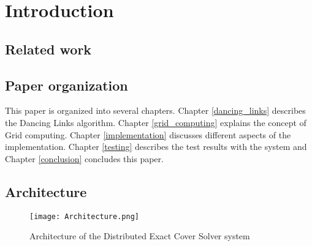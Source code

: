 
\chapter{Introduction}


\section{Related work}


\section{Paper organization}

This paper is organized into several chapters. Chapter \ref{dancing_links} describes the Dancing Links algorithm. Chapter \ref{grid_computing} explains the concept of Grid computing. Chapter \ref{implementation} discusses different aspects of the implementation. Chapter \ref{testing} describes the test results with the system and Chapter \ref{conclusion} concludes this paper.


\section{Architecture}


\begin{figure}[htb]
	\centering 
	\texttt{[image: Architecture.png]}
	\caption{Architecture of the Distributed Exact Cover Solver system}
	\label{fig:architecture}
\end{figure}

